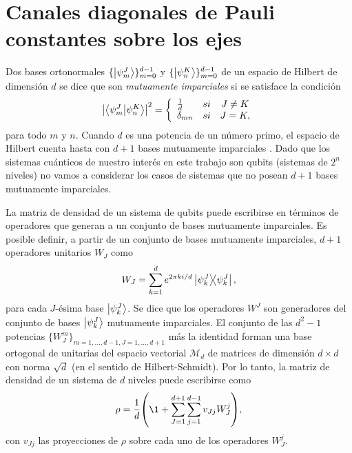 \section{Canales diagonales de Pauli constantes sobre los ejes} \label{sec:ch4_ruskai} %
Dos bases ortonormales $\{\ket{\psi_m^J}\}_{m=0}^{d-1}$
y $\{\ket{\psi_n^K}\}_{m=0}^{d-1}$ de un espacio de Hilbert
de dimensión $d$ se dice que son \textit{mutuamente 
imparciales} si se satisface la 
condición~\cite{bengtsson_zyczkowski_2017,nathanson2007pauli}
\begin{align}\label{eq:mub_definition}
	\abs{\braket{\psi_m^J}{\psi_n^K}}^2=
	\left\{ \begin{array}{lcc}
             \frac{1}{d} & si & J\ne K \\
             \delta_{mn} & si & J=K,
             \end{array}
   \right.
\end{align}
para todo $m$ y $n$. Cuando $d$  es una potencia de un 
número primo, el espacio de Hilbert cuenta hasta con $d+1$ bases mutuamente
imparciales \cite{durt2010mutually}. 
Dado que los sistemas cuánticos de nuestro interés en este trabajo son qubits 
(sistemas de $2^n$ niveles) no vamos a considerar los casos de sistemas que 
no posean $d+1$ bases mutuamente imparciales. 

La matriz de densidad de un sistema de qubits puede escribirse en términos 
de operadores que generan a un conjunto de bases mutuamente imparciales.
Es posible definir, a partir de un conjunto de bases mutuamente imparciales,
$d+1$ operadores unitarios $W_J$ como~\cite{nathanson2007pauli}
\begin{align}\label{eq:W_J}
	W_J=\sum_{k=1}^d e^{2\pi k i/d} \dyad{\psi_k^J}{\psi_k^J}, 
\end{align}
para cada $J$-ésima base $\ket{\psi_k^J}$. Se dice que los operadores 
$W^J$ son generadores del conjunto de bases $\ket{\psi_k^J}$ mutuamente 
imparciales. El conjunto de las $d^2-1$ potencias $\{W_J^m\}_{m=1,\ldots,d-1,
J=1,\ldots,d+1}$ más la identidad forman una base ortogonal
de unitarias del espacio vectorial $\mathcal{M}_d$ de matrices 
de dimensión $d\times d$ con norma $\sqrt{d}$
(en el sentido de Hilbert-Schmidt). Por lo tanto, la matriz de densidad
de un sistema de $d$ niveles puede escribirse como
\begin{align}\label{eq:rho_mub}
\rho=\frac{1}{d}\qty(\1+\sum_{J=1}^{d+1}\sum_{j=1}^{d-1} v_{Jj}W_J^j),
\end{align}
con $v_{Jj}$ las proyecciones de $\rho$ sobre cada uno de los 
operadores $W_J^j$.

